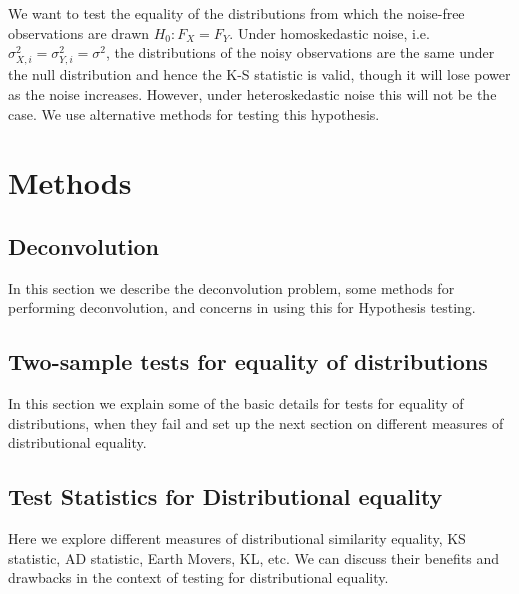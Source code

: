 \documentclass[12pt]{article}
\begin{document}
We want to test the equality of the distributions from which the noise-free observations are drawn $H_0: F_X = F_Y$. Under homoskedastic noise, i.e. $\sigma^2_{X,i} = \sigma^2_{Y,i} = \sigma^2$, the distributions of the noisy observations are the same under the null distribution and hence the K-S statistic is valid, though it will lose power as the noise increases. However, under heteroskedastic noise this will not be the case. We use alternative methods for testing this hypothesis. 



\section{Methods} %
\label{sec:methods}

\subsection{Deconvolution} %
\label{sub:deconvolution}
In this section we describe the deconvolution problem, some methods for performing deconvolution, and concerns in using this for Hypothesis testing. 

\subsection{Two-sample tests for equality of distributions} %
\label{sub:two_sample_tests_for_equality_of_distributions}

In this section we explain some of the basic details for tests for equality of distributions, when they fail and set up the next section on different measures of distributional equality. 



\subsection{Test Statistics for Distributional equality} %
\label{sub:test_statistics_for_distributional_equality}

Here we explore different measures of distributional similarity equality, KS statistic, AD statistic, Earth Movers, KL, etc. We can discuss their benefits and drawbacks in the context of testing for distributional equality. 

\end{document}
